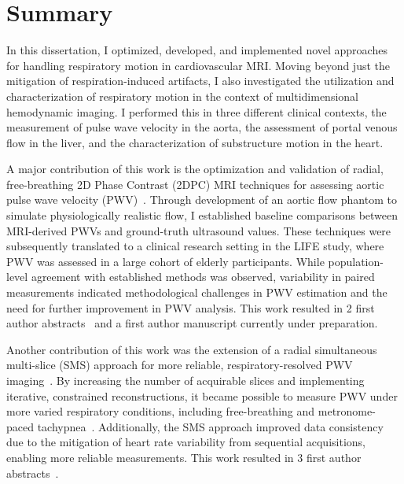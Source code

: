 \section{Summary}
In this dissertation, I optimized, developed, and implemented novel approaches for handling respiratory motion in cardiovascular MRI\@. Moving beyond just the mitigation of respiration-induced artifacts, I also investigated the utilization and characterization of respiratory motion in the context of multidimensional hemodynamic imaging. I performed this in three different clinical contexts, the measurement of pulse wave velocity in the aorta, the assessment of portal venous flow in the liver, and the characterization of substructure motion in the heart. 

A major contribution of this work is the optimization and validation of radial, free-breathing 2D Phase Contrast (2DPC) MRI techniques for assessing aortic pulse wave velocity (PWV)~\cite{robertsAdvancingFunctionalAssessment2023}. Through development of an aortic flow phantom to simulate physiologically realistic flow, I established baseline comparisons between MRI-derived PWVs and ground-truth ultrasound values. These techniques were subsequently translated to a clinical research setting in the LIFE study, where PWV was assessed in a large cohort of elderly participants. While population-level agreement with established methods was observed, variability in paired measurements indicated methodological challenges in PWV estimation and the need for further improvement in PWV analysis. This work resulted in 2 first author abstracts~\cite{narenComparingRobustnessRespiratoryresolved2024,narenFeasibility} and a first author manuscript currently under preparation. 

Another contribution of this work was the extension of a radial simultaneous multi-slice (SMS) approach for more reliable, respiratory-resolved PWV imaging~\cite{robertsAdvancingFunctionalAssessment2023}. By increasing the number of acquirable slices and implementing iterative, constrained reconstructions, it became possible to measure PWV under more varied respiratory conditions, including free-breathing and metronome-paced tachypnea~\cite{cooperMetronomePacedTachypneaSimple2024}. Additionally, the SMS approach improved data consistency due to the mitigation of heart rate variability from sequential acquisitions, enabling more reliable measurements. This work resulted in 3 first author abstracts~\cite{narenAorticPWVValsalva,narenAorticPWVValsalvaB,narenQuantifyingDifferences}. 

